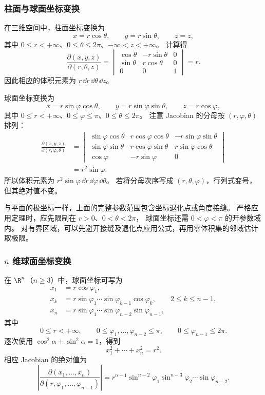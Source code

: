 \subsubsection*{柱面与球面坐标变换}

在三维空间中，柱面坐标变换为
\[
x=r\cos\theta,\qquad y=r\sin\theta,\qquad z=z,
\]
其中 $0\le r<+\infty$、$0\le\theta\le2\pi$、$-\infty<z<+\infty$。
计算得
\[
\frac{\partial(x,y,z)}{\partial(r,\theta,z)}
=\begin{vmatrix}
\cos\theta&-r\sin\theta&0\\
\sin\theta&r\cos\theta&0\\
0&0&1
\end{vmatrix}=r.
\]
因此相应的体积元素为 $r\,\dd r\,\dd\theta\,\dd z$。

\begin{center}

\end{center}



球面坐标变换为
\[
x=r\sin\varphi\cos\theta,\qquad
y=r\sin\varphi\sin\theta,\qquad z=r\cos\varphi,
\]
其中 $0\le r<+\infty$、$0\le\varphi\le\pi$、$0\le\theta\le2\pi$。
注意 Jacobian 的分母按 $(r,\varphi,\theta)$ 排列：
\[
\begin{aligned}
\frac{\partial(x,y,z)}{\partial(r,\varphi,\theta)}
&=\begin{vmatrix}
\sin\varphi\cos\theta&r\cos\varphi\cos\theta&-r\sin\varphi\sin\theta\\
\sin\varphi\sin\theta&r\cos\varphi\sin\theta&r\sin\varphi\cos\theta\\
\cos\varphi&-r\sin\varphi&0
\end{vmatrix}\\
&=r^2\sin\varphi.
\end{aligned}
\]
所以体积元素为 $r^2\sin\varphi\,\dd r\,\dd\varphi\,\dd\theta$。
若将分母次序写成 $(r,\theta,\varphi)$，行列式变号，但其绝对值不变。

与平面的极坐标一样，上面的完整参数范围包含坐标退化点或角度接缝。
严格应用定理时，应先限制在 $r>0$、$0<\theta<2\pi$，
球面坐标还需 $0<\varphi<\pi$ 的开参数域内。
对有界区域，可以先避开接缝及退化点应用公式，再用零体积集的邻域估计取极限。

\subsubsection*{$n$ 维球面坐标变换}

在 $\R^n$（$n\ge3$）中，球面坐标可写为
\[
\begin{aligned}
x_1&=r\cos\varphi_1,\\
x_k&=r\sin\varphi_1\cdots\sin\varphi_{k-1}\cos\varphi_k,
\qquad 2\le k\le n-1,\\
x_n&=r\sin\varphi_1\cdots\sin\varphi_{n-2}\sin\varphi_{n-1},
\end{aligned}
\]
其中
\[
0\le r<+\infty,\qquad
0\le\varphi_1,\ldots,\varphi_{n-2}\le\pi,\qquad
0\le\varphi_{n-1}\le2\pi.
\]
逐次使用 $\cos^2\alpha+\sin^2\alpha=1$，得到
\[
x_1^2+\cdots+x_n^2=r^2.
\]
相应 Jacobian 的绝对值为
\[
\left|\frac{\partial(x_1,\ldots,x_n)}
{\partial(r,\varphi_1,\ldots,\varphi_{n-1})}\right|
=r^{n-1}\sin^{n-2}\varphi_1\sin^{n-3}\varphi_2\cdots\sin\varphi_{n-2}.
\]

